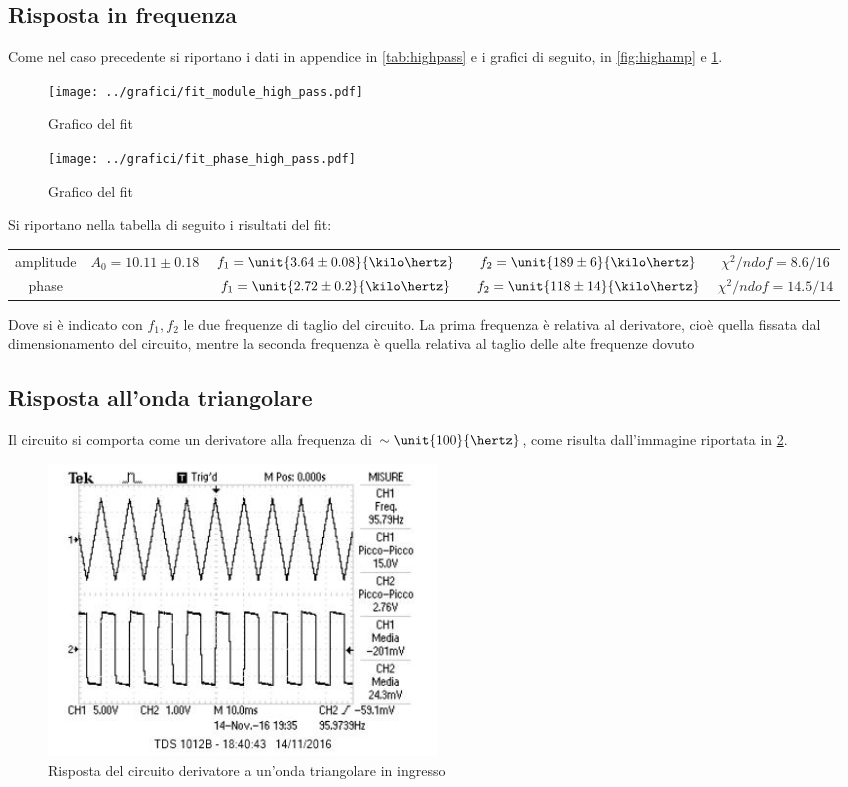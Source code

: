 \documentclass[10pt,a4paper]{article}
\begin{document}
\subsection{Risposta in frequenza}

Come nel caso precedente si riportano i dati in appendice in \tablename{\ref{tab:highpass}} e i grafici di seguito, in \figurename{\ref{fig:highamp}} e \figurename{\ref{fig:highph}}.

\begin{figure}[h!]
\centering
	\begin{minipage}[h!]{0.48\textwidth}
		\centering
		\texttt{[image: ../grafici/fit\_module\_high\_pass.pdf]}
		\caption{Grafico del fit }
		\label{fig:highamp}
	\end{minipage}
	\begin{minipage}[h!]{0.48\textwidth}
		\centering
		\texttt{[image: ../grafici/fit\_phase\_high\_pass.pdf]}
		\caption{Grafico del fit }
		\label{fig:highph}
	\end{minipage}
\end{figure}

Si riportano nella tabella di seguito i risultati del fit:

\begin{table}[h!]
\centering
\begin{tabular}{c|cccc}
amplitude	&	$A_0 = 10.11 \pm 0.18$	&	$f_1 = \unit{3.64 \pm 0.08}{\kilo\hertz}$	&	$f_2 = \unit{189 \pm 6}{\kilo\hertz}$	&	$\chi^2/ndof = 8.6 / 16$\\
phase		& &	$f_1 = \unit{2.72 \pm 0.2}{\kilo\hertz}$	&	$f_2 = \unit{118 \pm 14}{\kilo\hertz}$	&	$\chi^2/ndof = 14.5 / 14$
\end{tabular}
\end{table}

\noindent Dove si è indicato con $f_1, f_2$ le due frequenze di taglio del circuito. La prima frequenza è relativa al derivatore, cioè quella fissata dal dimensionamento del circuito, mentre la seconda frequenza è quella relativa al taglio delle alte frequenze dovuto 

\subsection{Risposta all'onda triangolare}
Il circuito si comporta come un derivatore alla frequenza di $\sim \unit{100}{\hertz}$, come risulta dall'immagine riportata in \figurename{\ref{fig:trdev}}.

\begin{figure}[h!]
	\centering
	\includegraphics[width=0.5\textwidth]{../oscilloscopio/trdev.jpg}
	\caption{Risposta del circuito derivatore a un'onda triangolare in ingresso}
	\label{fig:trdev}
\end{figure}
\end{document}
